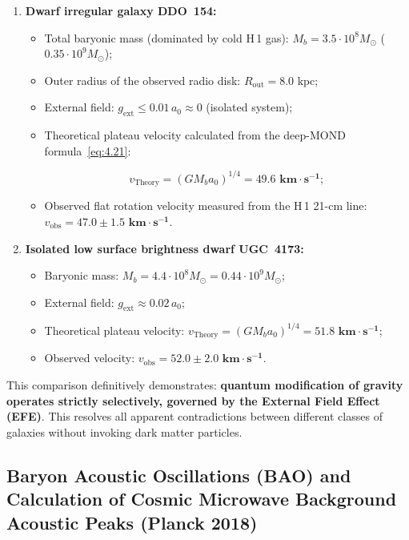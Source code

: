 \documentclass[11pt,a4paper]{article}
\theoremstyle{definition}
\newcommand{\ion}[2]{#1\,\textsc{\lowercase{#2}}}
\begin{document}
\begin{enumerate}
\item \textbf{Dwarf irregular galaxy DDO~154:}

\begin{itemize}
\item Total baryonic mass (dominated by cold \ion{H}{1} gas): $M_b = 3.5 \cdot 10^8 M_\odot$ ($0.35 \cdot 10^9 M_\odot$);
\item Outer radius of the observed radio disk: $R_{\text{out}} = 8.0\text{ kpc}$;
\item External field: $g_{\text{ext}} \le 0.01\,a_0 \approx 0$ (isolated system);
\item Theoretical plateau velocity calculated from the deep-MOND formula~\eqref{eq:4.21}:

\begin{equation}\label{eq:4.38}\tag{4.38}
v_{\text{Theory}} = (G M_b a_0)^{1/4} = \mathbf{49.6\text{ km}\cdot\text{s}^{-1}};
\end{equation}

\item Observed flat rotation velocity measured from the \ion{H}{1} 21-cm line: $v_{\text{obs}} = \mathbf{47.0 \pm 1.5\text{ km}\cdot\text{s}^{-1}}$.
\end{itemize}

\item \textbf{Isolated low surface brightness dwarf UGC~4173:}

\begin{itemize}
\item Baryonic mass: $M_b = 4.4 \cdot 10^8 M_\odot = 0.44 \cdot 10^9 M_\odot$;
\item External field: $g_{\text{ext}} \approx 0.02\,a_0$;
\item Theoretical plateau velocity: $v_{\text{Theory}} = (G M_b a_0)^{1/4} = \mathbf{51.8\text{ km}\cdot\text{s}^{-1}}$;
\item Observed velocity: $v_{\text{obs}} = \mathbf{52.0 \pm 2.0\text{ km}\cdot\text{s}^{-1}}$.
\end{itemize}
\end{enumerate}

This comparison definitively demonstrates: \textbf{quantum modification of gravity operates strictly selectively, governed by the External Field Effect (EFE)}. This resolves all apparent contradictions between different classes of galaxies without invoking dark matter particles.


\subsection{Baryon Acoustic Oscillations (BAO) and Calculation of Cosmic Microwave Background Acoustic Peaks (Planck 2018)}\label{sec:4.4}
\end{document}
